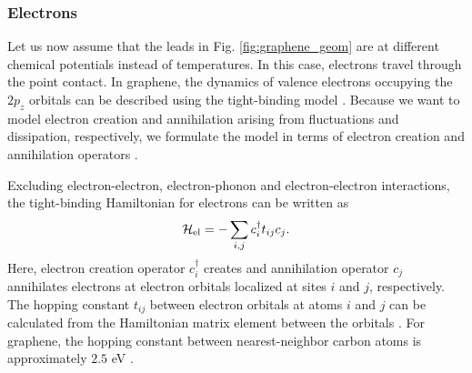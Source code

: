 

\subsubsection{Electrons}

Let us now assume that the leads in Fig. \ref{fig:graphene_geom} are at different chemical potentials instead of temperatures. In this case, electrons travel through the point contact. In graphene, the dynamics of valence electrons occupying the $2p_z$ orbitals can be described using the tight-binding model \cite{wallace47}. Because we want to model electron creation and annihilation arising from fluctuations and dissipation, respectively, we formulate the model in terms of electron creation and annihilation operators \cite{ballentine}. 

Excluding electron-electron, electron-phonon and electron-electron interactions, the tight-binding Hamiltonian for electrons can be written as \cite{datta}
\begin{equation}
 \mathcal{H}_{\textrm{el}} = - \sum_{i,j} c_i^{\dagger} t_{ij} c_j.
\end{equation}
Here, electron creation operator $c_i^{\dagger}$ creates and annihilation operator $c_j$ annihilates electrons at electron orbitals localized at sites $i$ and $j$, respectively. The hopping constant $t_{ij}$ between electron orbitals at atoms $i$ and $j$ can be calculated from the Hamiltonian matrix element between the orbitals \cite{}. For graphene, the hopping constant between nearest-neighbor carbon atoms is approximately $2.5$ eV \cite{dassarma11}.

